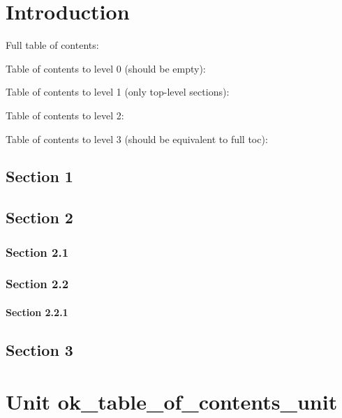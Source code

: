 \documentclass{report}
\begin{document}
\newlength{\tmplength}
\chapter{Introduction}
Full table of contents:



Table of contents to level 0 (should be empty):



Table of contents to level 1 (only top{-}level sections):



Table of contents to level 2:



Table of contents to level 3 (should be equivalent to full toc):



\section{Section 1}


\section{Section 2}


\subsection*{Section 2.1}


\subsection*{Section 2.2}


\subsubsection*{\large{\textbf{Section 2.2.1}}\normalsize\hspace{1ex}\hfill}


\section{Section 3}
\chapter{Unit ok{\_}table{\_}of{\_}contents{\_}unit}
\end{document}
